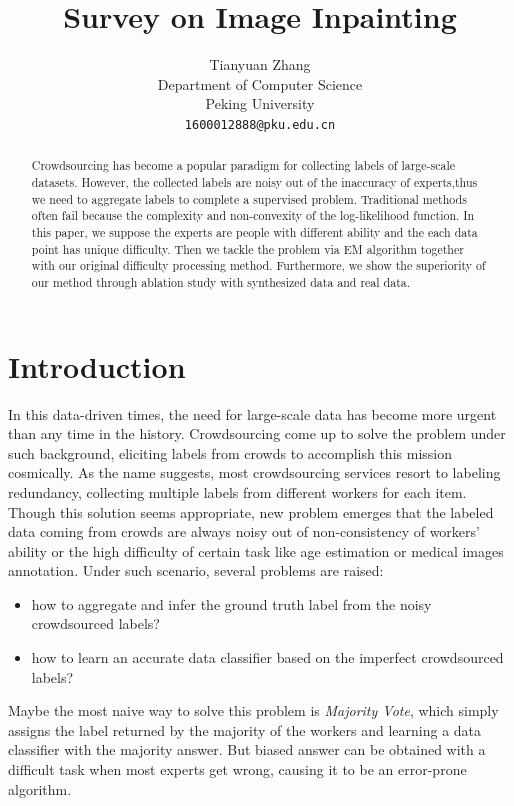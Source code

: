 \documentclass{article}
\title{Survey on Image Inpainting}
\author{
  Tianyuan Zhang \\%
  Department of Computer Science\\
  Peking University\\
  \texttt{1600012888@pku.edu.cn} \\
  }
\begin{document}

\maketitle

\begin{abstract}
  Crowdsourcing has become a popular paradigm for collecting labels of large-scale datasets. However, the collected labels are noisy out of the inaccuracy of experts,thus we need to aggregate labels to complete a supervised problem. Traditional methods often fail because the complexity and non-convexity of the log-likelihood function. In this paper, we suppose the experts are people with different ability and the each data point has unique difficulty. Then we tackle the problem via EM algorithm together with our original difficulty processing method. Furthermore, we show the superiority of our method through ablation study with synthesized data and real data.
\end{abstract}

\section{Introduction}
In this data-driven times, the need for large-scale data has become more urgent than any time in the history. Crowdsourcing come up to solve the problem under such background, eliciting labels from crowds to accomplish this mission cosmically. As the name suggests, most crowdsourcing services resort to labeling redundancy, collecting multiple labels from different workers for each item.  Though this solution seems appropriate, new problem emerges that the labeled data coming from crowds are always noisy out of non-consistency of workers' ability or the high difficulty of certain task like age estimation or medical images annotation. Under such scenario, several problems are raised:
\begin{itemize}
\item how to aggregate and infer the ground truth label from the noisy crowdsourced labels?
\item how to learn an accurate data classifier based on the imperfect crowdsourced labels?
\end{itemize}
Maybe the most naive way to solve this problem is \emph{Majority Vote}, which simply assigns the label returned by the majority of the workers and learning a data classifier with the majority answer. But biased answer can be obtained with a difficult task when most experts get wrong, causing it to be an error-prone algorithm.
\end{document}

